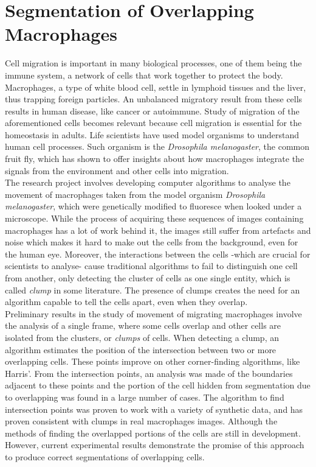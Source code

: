 \section*{Segmentation of Overlapping Macrophages}
% 
Cell migration is important in many biological processes, one of them
being the immune system, a network of cells that work together to protect the 
body. Macrophages, a type of white blood cell, settle in lymphoid tissues and 
the liver, thus trapping foreign particles\cite{Martinez2008}. 
An unbalanced migratory result from these cells results in human disease, 
like cancer or autoimmune. Study of migration of the aforementioned cells 
becomes relevant because cell migration is essential for the 
homeostasis in adults\cite{pocha2014}. 
Life scientists have used model organisms to understand human cell processes. 
Such organism is the \emph{Drosophila melanogaster}, the common fruit fly, 
which has shown to offer insights about how macrophages integrate the signals
from the environment and other cells into migration\cite{wood2017}.\medskip\\
% 
The research project involves developing computer algorithms to analyse the 
movement of macrophages taken from the model organism 
\emph{Drosophila melanogaster}, which were genetically modified to fluoresce 
when looked under a microscope\cite{Stramer2010}. While the process of acquiring 
these sequences of images containing macrophages has a lot of work behind it, 
the images still suffer from artefacts and noise which makes it hard to 
make out the cells from the background, even for the human eye. 
Moreover, the interactions between the cells -which are crucial for scientists
to analyse- cause traditional algorithms\cite{Henry2013,lu2015,Caselles} 
to fail to distinguish one cell from
another, only detecting the cluster of cells as one single entity, which is 
called \emph{clump} in some literature\cite{lu2015}. The presence of clumps
creates the need for an algorithm capable to tell the cells apart, even when 
they overlap.\medskip\\
% 
Preliminary results in the study of movement of migrating macrophages involve the 
analysis of a single frame, where some cells overlap and other cells are 
isolated from the clusters, or \emph{clumps} of cells. When detecting a clump, 
an algorithm estimates the position of the intersection between two or more
overlapping cells. These points improve on other corner-finding algorithms, like 
Harris'\cite{Harris1988}. From the intersection points, an analysis was made of 
the boundaries adjacent to these points and the portion of the cell hidden 
from segmentation due to overlapping was found in a large number of cases. The 
algorithm to find intersection points was proven to work with a variety of 
synthetic data, and has proven consistent with clumps in real macrophages 
images. Although the methods of finding the overlapped portions of the 
cells are still in development. However, current experimental results 
demonstrate the promise of this approach 
to produce correct segmentations of overlapping cells.